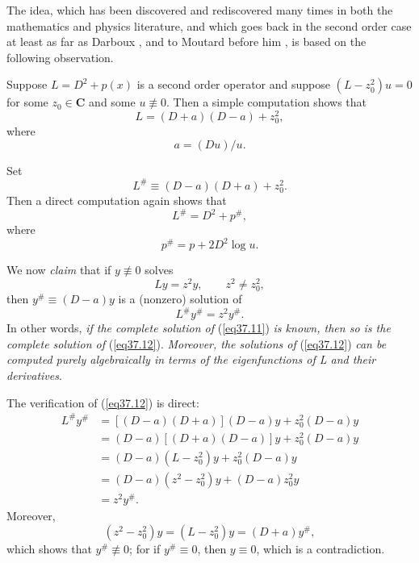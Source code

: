 \documentclass{surv-l}
\theoremstyle{plain}
\theoremstyle{definition}
\numberwithin{equation}{chapter}
\begin{document}
The idea, which has been discovered and rediscovered many times in both the mathematics and physics literature, and which goes back in the second order case at least as far as Darboux \cite{Da}, and to Moutard before him \cite{Mo}, is based on the following observation.

Suppose $L=D^{2}+p(x)$ is a second order operator and suppose $(L-z_{0}^{2})u=0$ for some $z_{0}\in \mathbf{C}$ and some $u\not\equiv 0$. Then a simple computation shows that
\begin{equation}\label{eq37.6}
L=(D+a)(D-a)+z_{0}^{2},
\end{equation}
where
\begin{equation}\label{eq37.7}
a=(Du)/u.
\end{equation}

Set
\begin{equation}\label{eq37.8}
L^{\#}\equiv(D-a)(D+a)+z_{0}^{2}.
\end{equation}
Then a direct computation again shows that
\begin{equation}\label{eq37.9}
L^{\#}=D^{2}+p^{\#},
\end{equation}
where
\begin{equation}\label{eq37.10}
p^{\#}=p+2D^{2}\log u.
\end{equation}

We now \emph{claim} that if $y\not\equiv 0$ solves
\begin{equation}\label{eq37.11}
Ly=z^{2}y, \qquad z^{2}\neq z_{0}^{2},
\end{equation}
then $y^{\#}\equiv(D-a)y$ is a (nonzero) solution of
\begin{equation}\label{eq37.12}
L^{\#}y^{\#}=z^{2}y^{\#}.
\end{equation}
In other words, \emph{if the complete solution of} (\ref{eq37.11}) \emph{is known, then so is the complete solution of} (\ref{eq37.12}). \emph{Moreover, the solutions of} (\ref{eq37.12}) \emph{can be computed purely algebraically in terms of the eigenfunctions of L and their derivatives}.

The verification of (\ref{eq37.12}) is direct:
\begin{align*}
L^{\#}y^{\#}&=[(D-a) (D+a)](D-a)y+z_{0}^{2}(D-a)y\\
&=(D-a)[(D+a)(D-a)]y+z_{0}^{2}(D-a)y\\
&=(D-a)(L-z_{0}^{2})y+z_{0}^{2}(D-a)y\\
&=(D-a)(z^{2}-z_{0}^{2})y+(D-a)z_{0}^{2}y\\
&=z^{2}y^{\#}.
\end{align*}
Moreover,
\begin{equation*}
(z^{2}-z_{0}^{2})y=(L-z_{0}^{2})y=(D+a)y^{\#},
\end{equation*}
which shows that $y^{\#}\not\equiv 0$; for if $y^{\#}\equiv 0$, then $y\equiv 0$, which is a contradiction.
\end{document}
